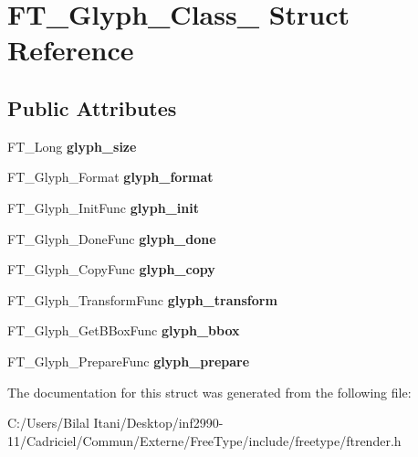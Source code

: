 \hypertarget{struct_f_t___glyph___class__}{}\section{F\+T\+\_\+\+Glyph\+\_\+\+Class\+\_\+ Struct Reference}
\label{struct_f_t___glyph___class__}
\subsection*{Public Attributes}
\begin{DoxyCompactItemize}
\item 
F\+T\+\_\+\+Long {\bfseries glyph\+\_\+size}\hypertarget{struct_f_t___glyph___class___a1a76c68b9fb0e93947e888c0fe77cbf8}{}\label{struct_f_t___glyph___class___a1a76c68b9fb0e93947e888c0fe77cbf8}

\item 
F\+T\+\_\+\+Glyph\+\_\+\+Format {\bfseries glyph\+\_\+format}\hypertarget{struct_f_t___glyph___class___a26738bd14d5845e18d09ccaa3a709d23}{}\label{struct_f_t___glyph___class___a26738bd14d5845e18d09ccaa3a709d23}

\item 
F\+T\+\_\+\+Glyph\+\_\+\+Init\+Func {\bfseries glyph\+\_\+init}\hypertarget{struct_f_t___glyph___class___a657200ad15ff061b38fb25b168737f95}{}\label{struct_f_t___glyph___class___a657200ad15ff061b38fb25b168737f95}

\item 
F\+T\+\_\+\+Glyph\+\_\+\+Done\+Func {\bfseries glyph\+\_\+done}\hypertarget{struct_f_t___glyph___class___aabf05a4368dccacf45e1a54e542e5d63}{}\label{struct_f_t___glyph___class___aabf05a4368dccacf45e1a54e542e5d63}

\item 
F\+T\+\_\+\+Glyph\+\_\+\+Copy\+Func {\bfseries glyph\+\_\+copy}\hypertarget{struct_f_t___glyph___class___afc78dcdc4802760ebcaccf3a7b6cd088}{}\label{struct_f_t___glyph___class___afc78dcdc4802760ebcaccf3a7b6cd088}

\item 
F\+T\+\_\+\+Glyph\+\_\+\+Transform\+Func {\bfseries glyph\+\_\+transform}\hypertarget{struct_f_t___glyph___class___a5f72ac1d0d92eb31fa3e2bb721a97ef2}{}\label{struct_f_t___glyph___class___a5f72ac1d0d92eb31fa3e2bb721a97ef2}

\item 
F\+T\+\_\+\+Glyph\+\_\+\+Get\+B\+Box\+Func {\bfseries glyph\+\_\+bbox}\hypertarget{struct_f_t___glyph___class___a06bfad431865c6731305cb781f78b317}{}\label{struct_f_t___glyph___class___a06bfad431865c6731305cb781f78b317}

\item 
F\+T\+\_\+\+Glyph\+\_\+\+Prepare\+Func {\bfseries glyph\+\_\+prepare}\hypertarget{struct_f_t___glyph___class___af7f406e5ea20a6614c946746938830c9}{}\label{struct_f_t___glyph___class___af7f406e5ea20a6614c946746938830c9}

\end{DoxyCompactItemize}


The documentation for this struct was generated from the following file\+:\begin{DoxyCompactItemize}
\item 
C\+:/\+Users/\+Bilal Itani/\+Desktop/inf2990-\/11/\+Cadriciel/\+Commun/\+Externe/\+Free\+Type/include/freetype/ftrender.\+h\end{DoxyCompactItemize}

